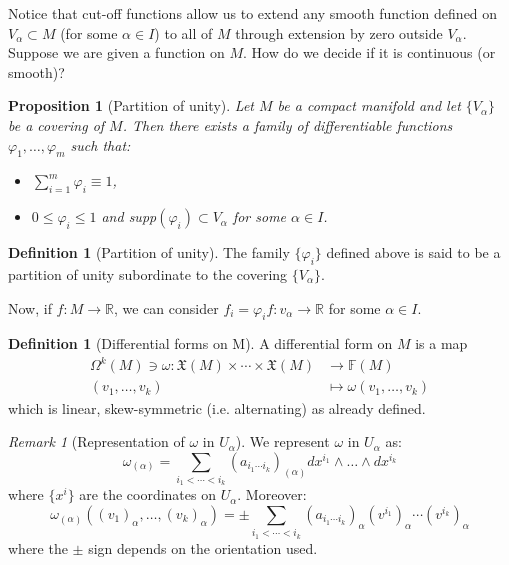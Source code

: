 \documentclass[a4paper,11pt,titlepage, article, oneside]{memoir}
\numberwithin{equation}{section}
\newtheorem{proposition}[theorem]{Proposition}
\theoremstyle{definition}
\newtheorem{definition}[theorem]{Definition}
\theoremstyle{remark}
\newtheorem{remark}[theorem]{Remark}
\newcommand{\rfield}{\mathbb{R}}
\begin{document}
Notice that cut-off functions allow us to extend any smooth function defined on $V_{\alpha} \subset M$ (for some $\alpha \in I$) to all of $M$ through extension by zero outside $V_{\alpha}$.
Suppose we are given a function on $M$. How do we decide if it is continuous (or smooth)?
\begin{proposition}[Partition of unity]
Let $M$ be a compact manifold and let $\{V_{\alpha}\}$ be a covering of $M$. Then there exists a family of differentiable functions $\varphi_1, \ldots, \varphi_m$ such that:
\begin{itemize}
  \item $\sum\limits_{i=1}^m \varphi_i \equiv 1$,
  \item $0 \le \varphi_i \le 1$ and supp$(\varphi_i) \subset V_{\alpha}$ for some $\alpha \in I$.
\end{itemize}
\end{proposition}

\begin{definition}[Partition of unity]
  The family $\{\varphi_i\}$ defined above is said to be a partition of unity subordinate to the covering $\{V_{\alpha}\}$.
\end{definition}

Now, if $f \colon M \rightarrow \rfield$, we can consider $f_i = \varphi_i f \colon v_{\alpha} \rightarrow \rfield$ for some $\alpha \in I$.

\begin{definition}[Differential forms on M] A differential form on $M$ is a map
  \begin{align}
    \Omega^k(M) \ni \omega \colon \mathfrak{X}(M) \times \cdots \times \mathfrak{X}(M) &\rightarrow \mathbb{F}(M) \\
    (v_1, \ldots, v_k) &\mapsto \omega(v_1, \ldots, v_k) \nonumber
  \end{align}
  which is linear, skew-symmetric (i.e. alternating) as already defined.
\end{definition}

\begin{remarkbox}\begin{remark}[Representation of $\omega$ in $U_{\alpha}$]
  We represent $\omega$ in $U_{\alpha}$ as:
  $$\omega_{(\alpha)} = \sum\limits_{i_1 < \cdots < i_k} (a_{i_1 \cdots i_k})_{(\alpha)} dx^{i_1} \wedge \ldots \wedge dx^{i_k}$$
  where $\{x^i\}$ are the coordinates on $U_{\alpha}$.
  Moreover:
  $$\omega_{(\alpha)} ((v_1)_{\alpha}, \ldots, (v_k)_{\alpha}) = \pm \sum\limits_{i_1 < \cdots < i_k} (a_{i_1\cdots i_k})_{\alpha} (v^{i_1})_{\alpha} \cdots (v^{i_k})_{\alpha}$$
  where the $\pm$ sign depends on the orientation used.
\end{remark}\end{remarkbox}
\end{document}
